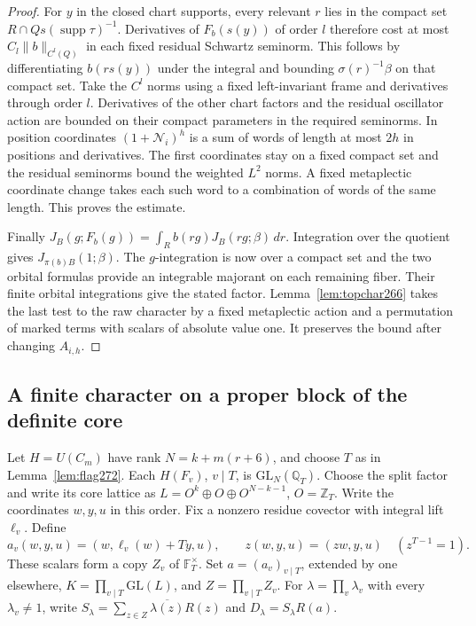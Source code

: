 \documentclass[a4paper,11pt]{article}
\theoremstyle{definition}
\theoremstyle{remark}
\numberwithin{equation}{section}
\begin{document}
\begin{proof}
For \(y\) in the closed chart supports, every relevant \(r\)
lies in the compact set \(R\cap Qs(\operatorname{supp}\tau)^{-1}\).
Derivatives of \(F_b(s(y))\) of order \(l\) therefore cost
at most \(C_l\|b\|_{C^l(Q)}\) in each fixed residual Schwartz
seminorm. This follows by differentiating \(b(rs(y))\)
under the integral and bounding \(\sigma(r)^{-1}\beta\) on
that compact set. Take the \(C^l\) norms using a fixed
left-invariant frame and derivatives through order \(l\).
Derivatives of the other chart factors and the residual
oscillator action are bounded on their compact parameters
in the required seminorms. In position coordinates
\((1+\mathcal N_i)^h\) is a sum of words of length at most
\(2h\) in positions and derivatives. The first coordinates
stay on a fixed compact set and the residual seminorms
bound the weighted \(L^2\) norms. A fixed metaplectic
coordinate change takes each such word to a combination of
words of the same length. This proves the estimate.

Finally \(J_B(g;F_b(g))=\int_R b(rg)J_B(rg;\beta)\,dr\).
Integration over the quotient gives \(J_{\pi(b)B}(1;\beta)\).
The \(g\)-integration is now over a compact set and the two
orbital formulas provide an integrable majorant on each
remaining fiber. Their finite orbital integrations give
the stated factor. Lemma~\ref{lem:topchar266} takes the last
test to the raw character by a fixed metaplectic action and
a permutation of marked terms with scalars of absolute value
one. It preserves the bound after changing \(A_{i,h}\).
\end{proof}

\subsection{A finite character on a proper block of the definite core}\label{nav:VII-45}
Let \(H=U(C_m)\) have rank \(N=k+m(r+6)\), and choose \(T\) as
in Lemma~\ref{lem:flag272}. Each \(H(F_v)\), \(v\mid T\), is
\(\mathrm{GL}_N(\mathbb Q_T)\). Choose the split factor and write its
core lattice as \(L=O^k\oplus O\oplus O^{N-k-1}\), \(O=\mathbb Z_T\).
Write the coordinates \(w,y,u\) in this order. Fix a nonzero
residue covector with integral lift \(\ell_v\). Define
\[
 a_v(w,y,u)=(w,\ell_v(w)+T y,u),\qquad
 z(w,y,u)=(zw,y,u)\quad(z^{T-1}=1).
\]
These scalars form a copy \(Z_v\) of \(\mathbb F_T^\times\).
Set \(a=(a_v)_{v\mid T}\), extended by one elsewhere,
\(K=\prod_{v\mid T}\mathrm{GL}(L)\), and \(Z=\prod_{v\mid T}Z_v\).
For \(\lambda=\prod_v\lambda_v\) with every \(\lambda_v\ne1\), write
\(S_\lambda=\sum_{z\in Z}\overline{\lambda(z)}R(z)\) and
\(D_\lambda=S_\lambda R(a)\).
\end{document}
